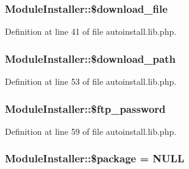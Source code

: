 \subsubsection[{\texorpdfstring{\$download\+\_\+file}{$download_file}}]{\setlength{\rightskip}{0pt plus 5cm}Module\+Installer\+::\$download\+\_\+file}\hypertarget{classModuleInstaller_a84752841ec1979052e8a2b700e8c93df}{}\label{classModuleInstaller_a84752841ec1979052e8a2b700e8c93df}


Definition at line 41 of file autoinstall.\+lib.\+php.

\subsubsection[{\texorpdfstring{\$download\+\_\+path}{$download_path}}]{\setlength{\rightskip}{0pt plus 5cm}Module\+Installer\+::\$download\+\_\+path}\hypertarget{classModuleInstaller_aa420e990f8276272c79846ad25a54858}{}\label{classModuleInstaller_aa420e990f8276272c79846ad25a54858}


Definition at line 53 of file autoinstall.\+lib.\+php.

\subsubsection[{\texorpdfstring{\$ftp\+\_\+password}{$ftp_password}}]{\setlength{\rightskip}{0pt plus 5cm}Module\+Installer\+::\$ftp\+\_\+password}\hypertarget{classModuleInstaller_ae6f8a411a4905b14ed0c03db7288b169}{}\label{classModuleInstaller_ae6f8a411a4905b14ed0c03db7288b169}


Definition at line 59 of file autoinstall.\+lib.\+php.

\subsubsection[{\texorpdfstring{\$package}{$package}}]{\setlength{\rightskip}{0pt plus 5cm}Module\+Installer\+::\$package = N\+U\+LL}\hypertarget{classModuleInstaller_a44c1003f12fa92f8b3eda2ec82159ead}{}\label{classModuleInstaller_a44c1003f12fa92f8b3eda2ec82159ead}


